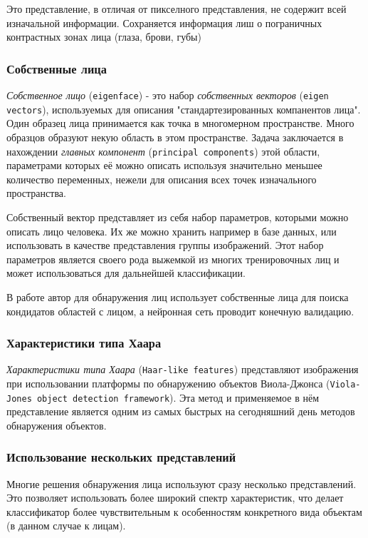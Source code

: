 \documentclass[12pt]{report}
\begin{document}
Это представление, в отличая от пикселного представления, не содержит всей изначальной информации. Сохраняется информация лиш о пограничных контрастных зонах лица (глаза, брови, губы)
\subsubsection{Собственные лица}
\emph{Собственное лицо} (\texttt{eigenface}) - это набор \emph{собственных векторов} (\texttt{eigen vectors}), используемых для описания "стандартезированных  компанентов лица". Один образец лица принимается как точка в многомерном пространстве. Много образцов образуют некую область в этом пространстве. Задача заключается в нахождении \emph{главных компонент} (\texttt{principal components}) этой области, параметрами которых её можно описать используя значительно меньшее количество переменных, нежели для описания всех точек изначального пространства.\citep{turk1991eigenfaces}

Собственный вектор представляет из себя набор параметров, которыми можно описать лицо человека. Их же можно хранить например в базе данных, или использовать в качестве представления группы изображений. Этот набор параметров является своего рода выжемкой из многих тренировочных лиц и может использоваться для дальнейшей классификации.

В работе \citep{tsai2006face} автор для обнаружения лиц использует собственные лица для поиска кондидатов областей с лицом, а нейронная сеть проводит конечную валидацию.
\subsubsection{Характеристики типа Хаара}
\emph{Характеристики типа Хаара} (\texttt{Haar-like features})  представляют изображения при использовании платформы по обнаружению объектов Виола-Джонса (\texttt{Viola-Jones object detection framework}). \citep{viola2001rapid}
Эта метод и применяемое в нём представление является одним из самых быстрых на сегодняшний день методов обнаружения объектов.
\subsubsection{Использование нескольких представлений}
Многие решения обнаружения лица используют сразу несколько представлений. Это позволяет использовать более широкий спектр характеристик, что делает классификатор более чувствительным к особенностям конкретного вида объектам (в данном случае к лицам).
\end{document}
